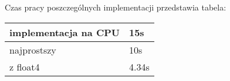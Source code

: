 
Czas pracy poszczególnych implementacji przedstawia tabela:



\begin{tabular}{ |p{\dimexpr 0.5\linewidth}|
                  p{\dimexpr 0.5\linewidth}| }
 \hline
 implementacja na CPU & 15s \\
 \hline
 najprostszy & 10s \\
 \hline
 z float4 & 4.34s \\
 \hline
\end{tabular}

 